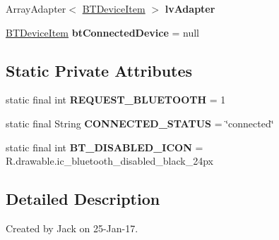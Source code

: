 \begin{DoxyCompactItemize}
\item 
\mbox{\label{classcom_1_1jack_1_1motorbikestatistics_1_1_pair_device_fragment_a5ab5efcda2c2fe8db4420ec28ea2840f}} 
Array\+Adapter$<$ \hyperlink{classcom_1_1jack_1_1motorbikestatistics_1_1_b_t_device_item}{B\+T\+Device\+Item} $>$ {\bfseries lv\+Adapter}
\item 
\mbox{\label{classcom_1_1jack_1_1motorbikestatistics_1_1_pair_device_fragment_afb95960b8365f4696444ea7683ebbf93}} 
\hyperlink{classcom_1_1jack_1_1motorbikestatistics_1_1_b_t_device_item}{B\+T\+Device\+Item} {\bfseries bt\+Connected\+Device} = null
\end{DoxyCompactItemize}
\subsection*{Static Private Attributes}
\begin{DoxyCompactItemize}
\item 
\mbox{\label{classcom_1_1jack_1_1motorbikestatistics_1_1_pair_device_fragment_ad6297326ae50ec30b7936e190beba44b}} 
static final int {\bfseries R\+E\+Q\+U\+E\+S\+T\+\_\+\+B\+L\+U\+E\+T\+O\+O\+TH} = 1
\item 
\mbox{\label{classcom_1_1jack_1_1motorbikestatistics_1_1_pair_device_fragment_a99e2ea55ac395622e937982582b2a6bf}} 
static final String {\bfseries C\+O\+N\+N\+E\+C\+T\+E\+D\+\_\+\+S\+T\+A\+T\+US} = \char`\"{}connected\char`\"{}
\item 
\mbox{\label{classcom_1_1jack_1_1motorbikestatistics_1_1_pair_device_fragment_a27b366d93919d4f48ab58834ce40b117}} 
static final int {\bfseries B\+T\+\_\+\+D\+I\+S\+A\+B\+L\+E\+D\+\_\+\+I\+C\+ON} = R.\+drawable.\+ic\+\_\+bluetooth\+\_\+disabled\+\_\+black\+\_\+24px
\end{DoxyCompactItemize}


\subsection{Detailed Description}
Created by Jack on 25-\/\+Jan-\/17. 


